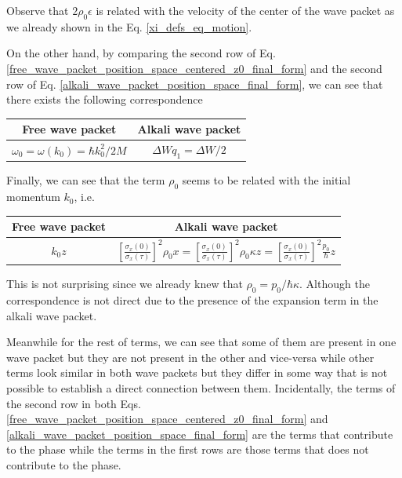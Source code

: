 \documentclass{article}
\begin{document}
Observe that $2 \rho_{0} \epsilon$ is related with the velocity of the center of the wave packet as we already shown in the Eq. \ref{xi_defs_eq_motion}.

On the other hand, by comparing the second row of Eq. \ref{free_wave_packet_position_space_centered_z0_final_form} and the second row of Eq. \ref{alkali_wave_packet_position_space_final_form}, we can see that there exists the following correspondence

\begin{center}
\begin{tabular}{||c | c||} 
 \hline
 Free wave packet & Alkali wave packet \\ [0.5ex] 
 \hline\hline
 $\omega_{0} = \omega(k_{0}) = \hbar k_{0}^{2} / 2M$ & $\Delta W q_{1} = \Delta W /2$ \\ [1ex] 
 \hline
\end{tabular}
\end{center}

Finally, we can see that the term $\rho_{0}$ seems to be related with the initial momentum $k_{0}$, i.e.

\begin{center}
\begin{tabular}{||c | c||} 
 \hline
 Free wave packet & Alkali wave packet \\ [0.5ex] 
 \hline\hline
 $k_{0}z$ & $\left[\frac{\sigma_{x}(0)}{\sigma_{x}(\tau)} \right]^{2} \rho_{0}x = \left[\frac{\sigma_{x}(0)}{\sigma_{x}(\tau)} \right]^{2} \rho_{0} \kappa z =  \left[\frac{\sigma_{x}(0)}{\sigma_{x}(\tau)} \right]^{2} \frac{p_{0}}{\hbar} z$ \\ [1ex] 
 \hline
\end{tabular}
\end{center}

This is not surprising since we already knew that $\rho_{0}=p_{0}/\hbar \kappa$. Although the correspondence is not direct due to the presence of the expansion term in the alkali wave packet.

Meanwhile for the rest of terms, we can see that some of them are present in one wave packet but they are not present in the other and vice-versa while other terms look similar in both wave packets but they differ in some way that is not possible to establish a direct connection between them. Incidentally, the terms of the second row in both Eqs. \ref{free_wave_packet_position_space_centered_z0_final_form} and \ref{alkali_wave_packet_position_space_final_form} are the terms that contribute to the phase while the terms in the first rows are those terms that does not contribute to the phase.
\end{document}
